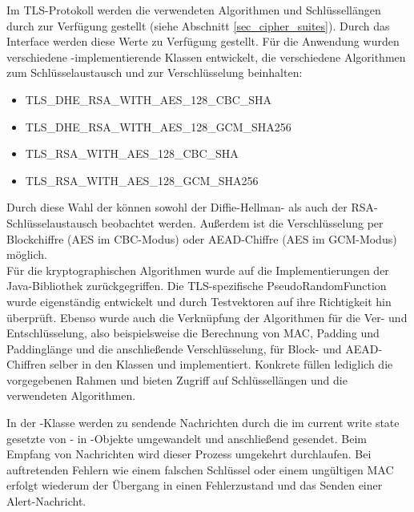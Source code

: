 Im TLS-Protokoll werden die verwendeten Algorithmen und Schlüssellängen durch \ciphersuites{} zur Verfügung gestellt (siehe Abschnitt \ref{sec_cipher_suites}). Durch das Interface  werden diese Werte zu Verfügung gestellt. Für die Anwendung wurden verschiedene -implementierende Klassen entwickelt, die verschiedene Algorithmen zum Schlüsselaustausch und zur Verschlüsselung beinhalten:
\begin{itemize}
\item TLS\_DHE\_RSA\_WITH\_AES\_128\_CBC\_SHA
\item TLS\_DHE\_RSA\_WITH\_AES\_128\_GCM\_SHA256
\item TLS\_RSA\_WITH\_AES\_128\_CBC\_SHA
\item TLS\_RSA\_WITH\_AES\_128\_GCM\_SHA256
\end{itemize}
Durch diese Wahl der \ciphersuites{} können sowohl der Diffie-Hellman- als auch der RSA-Schlüsselaustausch beobachtet werden. Außerdem ist die Verschlüsselung per Blockchiffre (AES im CBC-Modus) oder AEAD-Chiffre (AES im GCM-Modus) möglich. \\
Für die kryptographischen Algorithmen wurde auf die Implementierungen der Java-Bibliothek zurückgegriffen. Die TLS-spezifische PseudoRandomFunction wurde eigenständig entwickelt und durch Testvektoren auf ihre Richtigkeit hin überprüft. Ebenso wurde auch die Verknüpfung der Algorithmen für die Ver- und Entschlüsselung, also beispielsweise die Berechnung von MAC, Padding und Paddinglänge und die anschließende Verschlüsselung, für Block- und AEAD-Chiffren selber in den Klassen  und  implementiert. Konkrete \ciphersuites{} füllen lediglich die vorgegebenen Rahmen und bieten Zugriff auf Schlüssellängen und die verwendeten Algorithmen.

In der -Klasse werden zu sendende Nachrichten durch die im current write state gesetzte \ciphersuite{} von - in -Objekte umgewandelt und anschließend gesendet. Beim Empfang von Nachrichten wird dieser Prozess umgekehrt durchlaufen. Bei auftretenden Fehlern wie einem falschen Schlüssel oder einem ungültigen MAC erfolgt wiederum der Übergang in einen Fehlerzustand und das Senden einer Alert-Nachricht.


